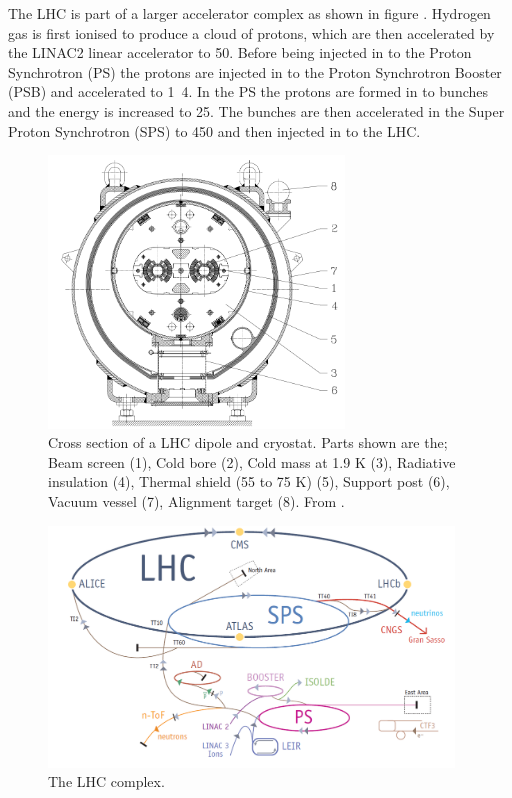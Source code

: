 The LHC is part of a larger accelerator complex as shown in figure
. Hydrogen gas is first ionised to produce a cloud of
protons, which are then accelerated by the LINAC2 linear accelerator to
\unit{50}{\MeV}.  Before being injected in to the Proton Synchrotron (PS) the
protons are injected in to the Proton Synchrotron Booster (PSB) and accelerated
to \unit{1.4}{\GeV}. In the PS the protons are formed in to bunches and the
energy is increased to \unit{25}{\GeV}. The bunches are then accelerated in the
Super Proton Synchrotron (SPS) to \unit{450}{\GeV} and then injected in to the
LHC.

\begin{figure}[htbp]
  \centering
  \includegraphics[width=0.7\textwidth]{lhcdipole.png}
  \caption{Cross section of a LHC dipole and cryostat. Parts shown are the; Beam
screen (1), Cold bore (2), Cold mass at 1.9 K (3),
Radiative insulation (4), Thermal shield (55 to 75 K) (5),
Support post (6), Vacuum vessel (7), Alignment target (8). From \cite{lyn}.}
  \label{fig:lhcdipole}
\end{figure}

\begin{figure}[htbp]
  \centering
  \includegraphics[width=0.96\textwidth]{accelerators.png}
  \caption{The LHC complex.}
  \label{fig:LHCcomplex}
\end{figure}

